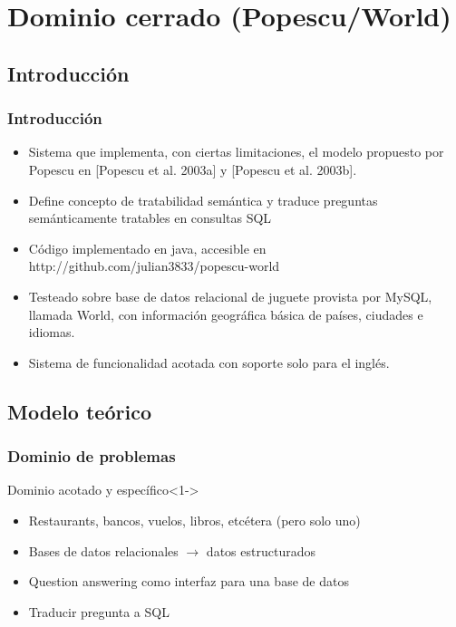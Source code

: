 \documentclass{beamer}
\begin{document}
\section{Dominio cerrado (Popescu/World)}
\subsection{Introducción}
\begin{frame}
\frametitle{Introducción}
\begin{itemize}
  \item Sistema que implementa, con ciertas limitaciones, el modelo propuesto por Popescu en [Popescu et al. 2003a] y  [Popescu et al. 2003b].
  \item Define concepto de tratabilidad semántica y traduce preguntas semánticamente tratables en consultas SQL
  \item Código implementado en java, accesible en http://github.com/julian3833/popescu-world
  \item Testeado sobre base de datos relacional de juguete provista por MySQL, llamada World, con información geográfica básica de países, ciudades e idiomas.
  \item Sistema de funcionalidad acotada con soporte solo para el inglés.
\end{itemize}
\end{frame}

\subsection{Modelo teórico}

\begin{frame}
  \frametitle{Dominio de problemas}
   \begin{block}{Dominio acotado y específico}<1->
      \begin{itemize}
          \item Restaurants, bancos, vuelos, libros, etcétera (pero solo uno)
          \item Bases de datos relacionales $\rightarrow$ datos estructurados
          \item Question answering como interfaz para una base de datos
          \item Traducir pregunta a SQL
      \end{itemize}
    \end{block}
\end{frame}
\end{document}
